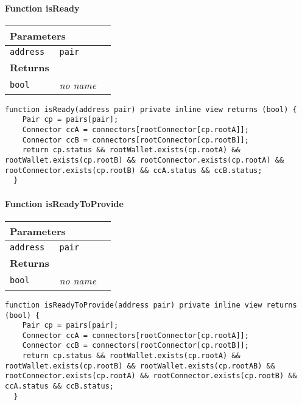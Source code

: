 \paragraph{Function isReady}


\ifsoltables
\noindent\begin{tabular}{|l|l|p{5cm}|}\hline
\multicolumn{3}{|l|}{\bf Parameters}\\\hline
\tt address & \tt pair &\\\hline
\multicolumn{3}{|l|}{\bf Returns}\\\hline
\tt bool & {\em no name} &\\\hline
\end{tabular}
\fi

\vspace{2cm}

\begin{lstlisting}[firstnumber=198]
  function isReady(address pair) private inline view returns (bool) {
    Pair cp = pairs[pair];
    Connector ccA = connectors[rootConnector[cp.rootA]];
    Connector ccB = connectors[rootConnector[cp.rootB]];
    return cp.status && rootWallet.exists(cp.rootA) && rootWallet.exists(cp.rootB) && rootConnector.exists(cp.rootA) && rootConnector.exists(cp.rootB) && ccA.status && ccB.status;
  }
\end{lstlisting}

\paragraph{Function isReadyToProvide}


\ifsoltables
\noindent\begin{tabular}{|l|l|p{5cm}|}\hline
\multicolumn{3}{|l|}{\bf Parameters}\\\hline
\tt address & \tt pair &\\\hline
\multicolumn{3}{|l|}{\bf Returns}\\\hline
\tt bool & {\em no name} &\\\hline
\end{tabular}
\fi

\vspace{2cm}

\begin{lstlisting}[firstnumber=206]
  function isReadyToProvide(address pair) private inline view returns (bool) {
    Pair cp = pairs[pair];
    Connector ccA = connectors[rootConnector[cp.rootA]];
    Connector ccB = connectors[rootConnector[cp.rootB]];
    return cp.status && rootWallet.exists(cp.rootA) && rootWallet.exists(cp.rootB) && rootWallet.exists(cp.rootAB) && rootConnector.exists(cp.rootA) && rootConnector.exists(cp.rootB) && ccA.status && ccB.status;
  }
\end{lstlisting}

